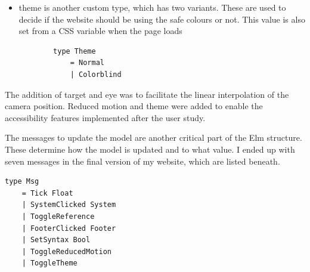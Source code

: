 \documentclass{l4proj}
\begin{document}
\begin{itemize}
    \item theme is another custom type, which has two variants.  These are used to decide if the website should be using the safe colours or not.  This value is also set from a CSS variable when the page loads

    \begin{lstlisting}
        type Theme
            = Normal
            | Colorblind

    \end{lstlisting}
\end{itemize}

The addition of target and eye was to facilitate the linear interpolation of the camera position.  Reduced motion and theme were added to enable the accessibility features implemented after the user study.

The messages to update the model are another critical part of the Elm structure. These determine how the model is updated and to what value.  I ended up with seven messages in the final version of my website, which are listed beneath.

\begin{lstlisting}
type Msg
    = Tick Float
    | SystemClicked System
    | ToggleReference
    | FooterClicked Footer
    | SetSyntax Bool
    | ToggleReducedMotion
    | ToggleTheme
\end{lstlisting}
\end{document}
